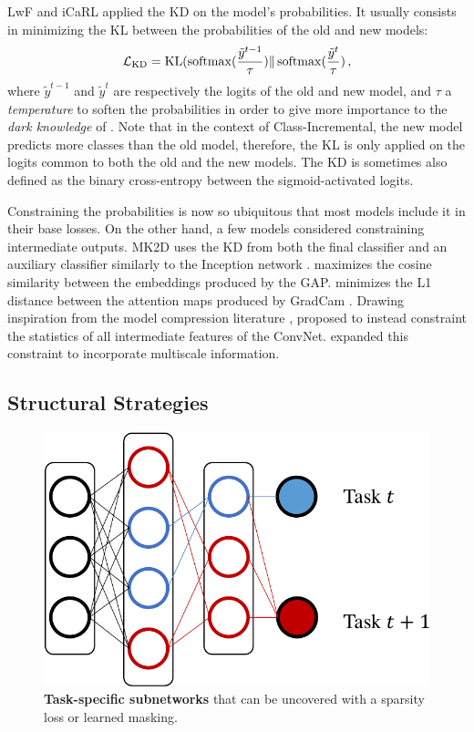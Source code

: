 LwF \cite{li2018lwf} and iCaRL applied the \ac{KD} \cite{hinton2015knowledge_distillation} on the
model's probabilities. It usually consists in minimizing the \ac{KL} between the probabilities
of the old and new models:
%
\begin{equation}
      \mathcal{L}_\text{KD} = \operatorname{KL}(\operatorname{softmax}(\frac{\tilde{y}^{t-1}}{\tau}) \Vert \operatorname{softmax}(\frac{\tilde{y}^t}{\tau})\,,
\end{equation}
%
where $\tilde{y}^{t-1}$ and $\tilde{y}^{t}$ are respectively the logits of the old and new model,
and $\tau$ a \textit{temperature} to soften the probabilities in order to give more importance to
the \textit{dark knowledge} of \cite{hinton2015knowledge_distillation}. Note that in the context of
Class-Incremental, the new model predicts more classes than the old model, therefore, the \ac{KL} is
only applied on the logits common to both the old and the new models. The \ac{KD} is sometimes also
defined as the binary cross-entropy between the sigmoid-activated logits.

Constraining the probabilities is now so ubiquitous that most models include it in their base
losses. On the other hand, a few models considered constraining intermediate outputs. MK2D
\citep{peng2019m2kd} uses the \ac{KD} from both the final classifier and an auxiliary classifier
similarly to the Inception network \citep{szegedy2015inception}. \cite{hou2019ucir} maximizes the
cosine similarity between the embeddings produced by the \ac{GAP}.
\cite{dhar2019learning_without_memorizing_gradcam} minimizes the L1 distance between the attention
maps produced by GradCam \citep{selvaraju2017gradcam}. Drawing inspiration from the model
compression literature \cite{zagoruyko2016distillation_attention}, \cite{douillard2020podnet}
proposed to instead constraint the statistics of all intermediate features of the \ac{ConvNet}.
\cite{douillard2020plop} expanded this constraint to incorporate multiscale information.

\subsection{Structural Strategies}
\label{sec:related_structural}

\begin{figure}[tb]
      \begin{center}
            \includegraphics[width=0.6\linewidth]{images/related/subnetworks.pdf}
      \end{center}
      \caption{\textbf{Task-specific subnetworks} that can be uncovered with a sparsity loss or
            learned masking.}
      \label{fig:related_subnetwork}
\end{figure}

